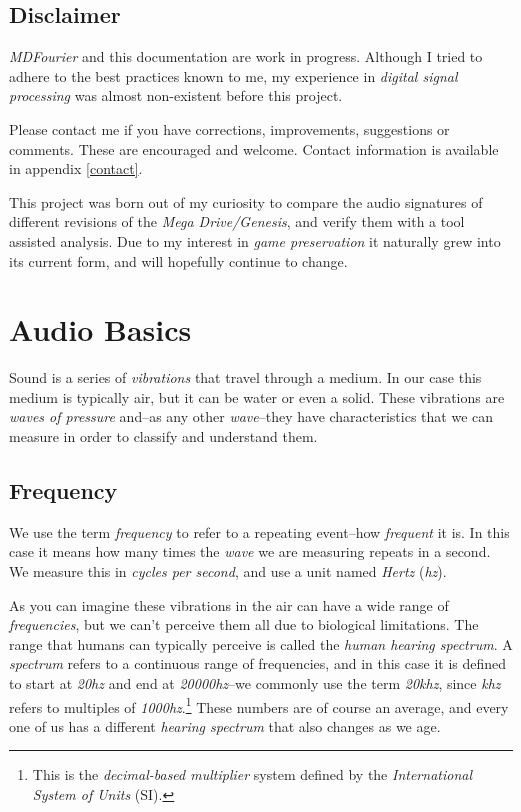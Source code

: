 \documentclass[10pt,a4paper]{report}
\newcommand{\ac}[1]{\textit{\acrshort{#1}}}
\newcommand{\hz}[1]{\textit{#1\acrshort{hz}}}
\newcommand{\khz}[1]{\textit{#1\acrshort{khz}}}
\begin{document}
\newpage
\section{Disclaimer}

\textit{MDFourier} and this documentation are work in progress. Although I tried to adhere to the best practices known to me, my experience in \textit{digital signal processing} was almost non-existent before this project. 

Please contact me if you have corrections, improvements, suggestions or comments. These are encouraged and welcome. Contact information is available in appendix \ref{contact}.

This project was born out of my curiosity to compare the audio signatures of different revisions of the \textit{Mega Drive/Genesis}, and verify them with a tool assisted analysis. Due to my interest in \textit{game preservation} it naturally grew into its current form, and will hopefully continue to change.

\chapter{Audio Basics}
 
Sound is a series of \textit{vibrations} that travel through a medium. In our case this medium is typically air, but it can be water or even a solid. These vibrations are \textit{waves of pressure} and--as any other \textit{wave}--they have characteristics that we can measure in order to classify and understand them. 

\section{Frequency}

We use the term \textit{frequency} to refer to a repeating event--how \textit{frequent} it is. In this case it means how many times the \textit{wave} we are measuring repeats in a second. We measure this in \textit{cycles per second}, and use a unit named \textit{Hertz} (\ac{hz}). 

As you can imagine these vibrations in the air can have a wide range of \textit{frequencies}, but we can't perceive them all due to biological limitations. The range that humans can typically perceive is called the \textit{human hearing spectrum}. A \textit{spectrum} refers to a continuous range of frequencies, and in this case it is defined to start at \hz{20} and end at \hz{20000}--we commonly use the term \khz{20}, since \ac{khz} refers to multiples of \hz{1000}.\footnote{This is the \textit{decimal-based multiplier} system defined by the \textit{International System of Units} (SI).} These numbers are of course an average, and every one of us has a different \textit{hearing spectrum} that also changes as we age.
\end{document}
